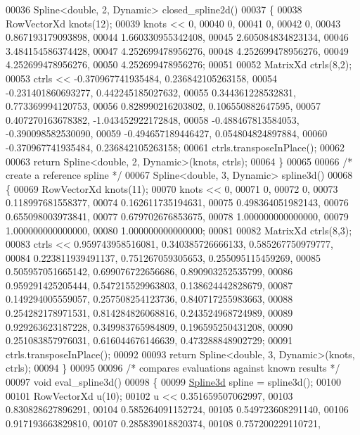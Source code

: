 \begin{DoxyCode}
00036 Spline<double, 2, Dynamic> closed\_spline2d()
00037 \{
00038   RowVectorXd knots(12);
00039   knots << 0,
00040     0,
00041     0,
00042     0,
00043     0.867193179093898,
00044     1.660330955342408,
00045     2.605084834823134,
00046     3.484154586374428,
00047     4.252699478956276,
00048     4.252699478956276,
00049     4.252699478956276,
00050     4.252699478956276;
00051 
00052   MatrixXd ctrls(8,2);
00053   ctrls << -0.370967741935484,   0.236842105263158,
00054     -0.231401860693277,   0.442245185027632,
00055     0.344361228532831,   0.773369994120753,
00056     0.828990216203802,   0.106550882647595,
00057     0.407270163678382,  -1.043452922172848,
00058     -0.488467813584053,  -0.390098582530090,
00059     -0.494657189446427,   0.054804824897884,
00060     -0.370967741935484,   0.236842105263158;
00061   ctrls.transposeInPlace();
00062 
00063   \textcolor{keywordflow}{return} Spline<double, 2, Dynamic>(knots, ctrls);
00064 \}
00065 
00066 \textcolor{comment}{/* create a reference spline */}
00067 Spline<double, 3, Dynamic> spline3d()
00068 \{
00069   RowVectorXd knots(11);
00070   knots << 0,
00071     0,
00072     0,
00073     0.118997681558377,
00074     0.162611735194631,
00075     0.498364051982143,
00076     0.655098003973841,
00077     0.679702676853675,
00078     1.000000000000000,
00079     1.000000000000000,
00080     1.000000000000000;
00081 
00082   MatrixXd ctrls(8,3);
00083   ctrls <<    0.959743958516081,   0.340385726666133,   0.585267750979777,
00084     0.223811939491137,   0.751267059305653,   0.255095115459269,
00085     0.505957051665142,   0.699076722656686,   0.890903252535799,
00086     0.959291425205444,   0.547215529963803,   0.138624442828679,
00087     0.149294005559057,   0.257508254123736,   0.840717255983663,
00088     0.254282178971531,   0.814284826068816,   0.243524968724989,
00089     0.929263623187228,   0.349983765984809,   0.196595250431208,
00090     0.251083857976031,   0.616044676146639,   0.473288848902729;
00091   ctrls.transposeInPlace();
00092 
00093   \textcolor{keywordflow}{return} Spline<double, 3, Dynamic>(knots, ctrls);
00094 \}
00095 
00096 \textcolor{comment}{/* compares evaluations against known results */}
00097 \textcolor{keywordtype}{void} eval\_spline3d()
00098 \{
00099   \hyperlink{namespace_eigen_a652b0c454d2123a13f04922404bed782}{Spline3d} spline = spline3d();
00100 
00101   RowVectorXd u(10);
00102   u << 0.351659507062997,
00103     0.830828627896291,
00104     0.585264091152724,
00105     0.549723608291140,
00106     0.917193663829810,
00107     0.285839018820374,
00108     0.757200229110721,

\end{DoxyCode}
